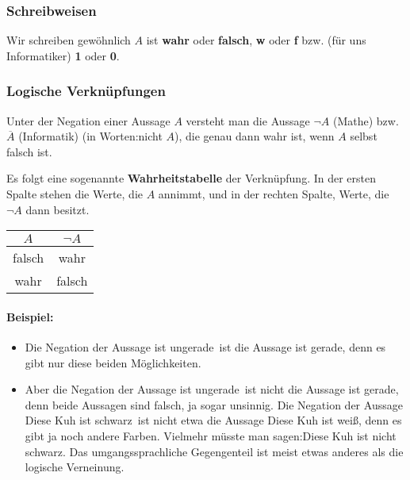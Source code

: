 \subsubsection*{Schreibweisen}
Wir schreiben gewöhnlich $A$ ist \textbf{wahr} oder \textbf{falsch}, \textbf{w} oder \textbf{f} bzw. (für uns Informatiker) \textbf{1} oder \textbf{0}.

\subsubsection{Logische Verknüpfungen}
\begin{definition}[Negation]
Unter der Negation einer Aussage $A$ versteht man die Aussage $\neg A$ (Mathe) bzw. $\overline{A}$ (Informatik) (in Worten:\glqq nicht $A$\grqq ), die genau dann wahr ist, wenn $A$ selbst falsch ist.
\end{definition}
Es folgt eine sogenannte \textbf{Wahrheitstabelle} der Verknüpfung. In der ersten Spalte stehen die Werte, die $A$ annimmt, und in der rechten Spalte, Werte, die $\neg A$ dann besitzt.
\begin{center}
\begin{tabular}{c||c}
 $A$ & $\neg A$  \\ 
\hline
\cellcolor{ared}falsch  & \cellcolor{agreen}wahr   \\ 
\cellcolor{agreen}wahr  & \cellcolor{ared} falsch  \\ 
\hline
\end{tabular}
\end{center}

\paragraph*{Beispiel:}
\begin{itemize}
	\item Die Negation der Aussage  ist ungerade\grqq \ ist die Aussage  ist gerade\grqq , denn es gibt nur diese beiden Möglichkeiten.
	\item Aber die Negation der Aussage  ist ungerade\grqq \ ist nicht die Aussage  ist gerade\grqq, denn beide Aussagen sind falsch, ja sogar unsinnig. Die Negation der Aussage \glqq Diese Kuh ist schwarz\grqq \ ist nicht etwa die Aussage \glqq Diese Kuh ist weiß\grqq , denn es gibt ja noch andere Farben. Vielmehr müsste man sagen:\glqq Diese Kuh ist nicht schwarz\grqq. Das umgangssprachliche Gegengenteil ist meist etwas anderes als die logische Verneinung.
\end{itemize}

